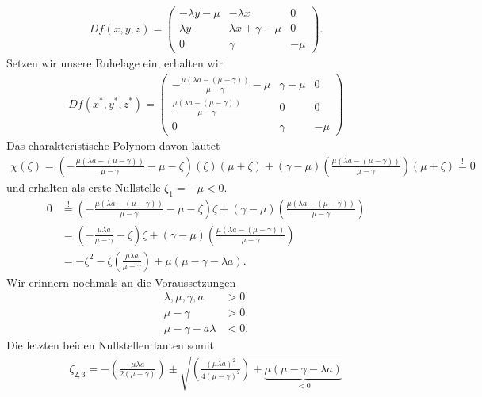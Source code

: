 \begin{solution}
\begin{align*}
  Df(x,y,z) = \begin{pmatrix}
  -\lambda y - \mu & - \lambda x & 0 \\
  \lambda y& \lambda x + \gamma - \mu & 0 \\
  0 & \gamma & -\mu
  \end{pmatrix}.
\end{align*}
Setzen wir unsere Ruhelage ein, erhalten wir
\begin{align*}
  Df(x^*,y^*,z^*) = \begin{pmatrix}
  -\frac{\mu(\lambda a - (\mu - \gamma))}{\mu - \gamma} - \mu & \gamma - \mu & 0 \\
  \frac{\mu(\lambda a - (\mu - \gamma))}{\mu - \gamma}& 0 & 0 \\
  0 & \gamma & -\mu
  \end{pmatrix}
\end{align*}
Das charakteristische Polynom davon lautet
\begin{align*}
  \chi(\zeta) = \left(-\frac{\mu(\lambda a - (\mu - \gamma))}{\mu - \gamma} - \mu - \zeta\right)(\zeta)
  (\mu + \zeta) + (\gamma - \mu)
  \left(\frac{\mu(\lambda a - (\mu - \gamma))}{\mu - \gamma}\right)
  (\mu + \zeta) \stackrel{!}{=} 0
\end{align*}
und erhalten als erste Nullstelle $\zeta_1 = -\mu < 0$.
\begin{align*}
  0 &\stackrel{!}{=} \left(-\frac{\mu(\lambda a - (\mu - \gamma))}{\mu - \gamma} - \mu - \zeta\right)\zeta
  + (\gamma - \mu)\left(\frac{\mu(\lambda a - (\mu - \gamma))}{\mu - \gamma}\right) \\
  &= \left(-\frac{\mu\lambda a}{\mu - \gamma} - \zeta\right)\zeta
  + (\gamma - \mu)\left(\frac{\mu(\lambda a - (\mu - \gamma))}{\mu - \gamma}\right)\\
  &= -\zeta^2 - \zeta\left(\frac{\mu\lambda a}{\mu - \gamma}\right)
  + \mu(\mu - \gamma - \lambda a).
\end{align*}
Wir erinnern nochmals an die Voraussetzungen
\begin{align*}
  \lambda, \mu, \gamma, a &> 0 \\
  \mu - \gamma &> 0 \\
  \mu - \gamma - a\lambda &< 0.
\end{align*}
Die letzten beiden Nullstellen lauten somit
\begin{align*}
  \zeta_{2,3} = - \left(\frac{\mu\lambda a}{2(\mu - \gamma)}\right)
  \pm \sqrt{\left(\frac{(\mu\lambda a)^2}{4(\mu - \gamma)^2}\right)
   + \underbrace{\mu(\mu - \gamma - \lambda a)}_{< 0}}

\end{align*}
\end{solution}
